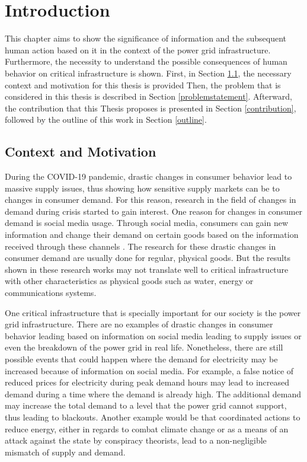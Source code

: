 \chapter{Introduction}

This chapter aims to show the significance of information and 
the subsequent human action based on it
in the context of the power grid infrastructure.
Furthermore, the necessity to understand the possible consequences 
of human behavior on critical infrastructure is shown. 
First, in Section \ref{contextmotivation}, the necessary context and motivation for this thesis is provided
Then, the problem that is considered in this thesis is described 
in Section \ref{problemstatement}. Afterward, the contribution that this
Thesis proposes is presented in Section \ref{contribution}, 
followed by the outline of this work in Section \ref{outline}.

\section{Context and Motivation}
\label{contextmotivation}

During the COVID-19 pandemic, drastic changes in consumer behavior
lead to massive supply issues, thus showing how sensitive supply markets 
can be to changes in consumer demand.
For this reason, research in the field of changes in demand during crisis
started to gain interest. One reason for changes in consumer demand is 
social media usage. Through social media, consumers can gain new information
and change their demand on certain goods based on the information received 
through these channels \cite{naeem2021social}.
The research for these drastic changes in consumer demand are usually
done for regular, physical goods. But the results shown in these 
research works may not translate well to critical infrastructure
with other characteristics as physical goods such as 
water, energy or communications systems.

One critical infrastructure that is specially important for 
our society is the power grid infrastructure.
There are no examples of drastic changes in consumer behavior leading
based on information on social media leading to supply issues or
even the breakdown of the power grid in real life. Nonetheless, there 
are still possible events that could happen where the demand for
electricity may be increased because of information on social media.
For example, a false notice of reduced prices for electricity
during peak demand hours may lead to increased demand during 
a time where the demand is already high. The additional demand
may increase the total demand to a level that the power grid
cannot support, thus leading to blackouts.
Another example would be that coordinated actions to reduce
energy, either in regards to combat climate change \cite{earthday}
or as a means of an attack against the state by conspiracy theorists,
lead to a non-negligible mismatch of supply and demand.


